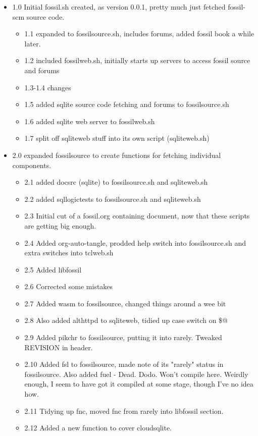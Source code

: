 \documentclass[11pt]{article}
\begin{document}
\begin{itemize}
\item 1.0 Initial fossil.sh created, as version 0.0.1, pretty much just fetched fossil-scm source
code.
\begin{itemize}
\item 1.1 expanded to fossilsource.sh, includes forums, added fossil book a while later.
\item 1.2 included fossilweb.sh, initially starts up servers to access fossil source and forums
\item 1.3-1.4 changes
\item 1.5 added sqlite source code fetching and forums to fossilsource.sh
\item 1.6 added sqlite web server to fossilweb.sh
\item 1.7 split off sqliteweb stuff into its own script (sqliteweb.sh)
\end{itemize}
\item 2.0 expanded fossilsource to create functions for fetching individual components.
\begin{itemize}
\item 2.1 added docsrc (sqlite) to fossilsource.sh and sqliteweb.sh
\item 2.2 added sqllogictests to fossilsource.sh and sqliteweb.sh

\item 2.3 Initial cut of a fossil.org containing document, now that these scripts are getting big
enough.
\item 2.4 Added org-auto-tangle, prodded help switch into fossilsource.sh and extra switches into tclweb.sh
\item 2.5 Added libfossil
\item 2.6 Corrected some mistakes
\item 2.7 Added wasm to fossilsource, changed things around a wee bit
\item 2.8 Also added althttpd to sqliteweb, tidied up case switch on \$@
\item 2.9 Added pikchr to fossilsource, putting it into rarely. Tweaked REVISION in header.
\item 2.10 Added fsl to fossilsource, made note of its "rarely" status in fossilsource. 
Also added fuel - Dead. Dodo. Won't compile here. Weirdly enough, I seem to have got it compiled at some stage, though I've no idea how.
\item 2.11 Tidying up fnc, moved fnc from rarely into libfossil section.
\item 2.12 Added a new function to cover cloudsqlite.
\end{itemize}
\end{itemize}
\newpage
\end{document}
